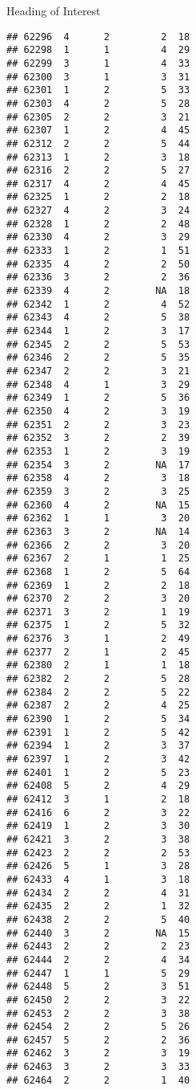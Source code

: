 \documentclass[
  ignorenonframetext,
]{beamer}
\begin{document}
\begin{frame}[fragile]{Heading of Interest}
\begin{verbatim}
## 62296  4      2         2  18
## 62298  1      1         4  29
## 62299  3      1         4  33
## 62300  3      1         3  31
## 62301  1      2         5  33
## 62303  4      2         5  28
## 62305  2      2         3  21
## 62307  1      2         4  45
## 62312  2      2         5  44
## 62313  1      2         3  18
## 62316  2      2         5  27
## 62317  4      2         4  45
## 62325  1      2         2  18
## 62327  4      2         3  24
## 62328  1      2         2  48
## 62330  4      2         3  29
## 62333  1      2         1  51
## 62335  4      2         2  50
## 62336  3      2         2  36
## 62339  4      2        NA  18
## 62342  1      2         4  52
## 62343  4      2         5  38
## 62344  1      2         3  17
## 62345  2      2         5  53
## 62346  2      2         5  35
## 62347  2      2         3  21
## 62348  4      1         3  29
## 62349  1      2         5  36
## 62350  4      2         3  19
## 62351  2      2         3  23
## 62352  3      2         2  39
## 62353  1      2         3  19
## 62354  3      2        NA  17
## 62358  4      2         3  18
## 62359  3      2         3  25
## 62360  4      2        NA  15
## 62362  1      1         3  20
## 62363  3      2        NA  14
## 62366  2      2         3  20
## 62367  2      1         1  25
## 62368  1      2         5  64
## 62369  1      2         2  18
## 62370  2      2         3  20
## 62371  3      2         1  19
## 62375  1      2         5  32
## 62376  3      1         2  49
## 62377  2      1         2  45
## 62380  2      1         1  18
## 62382  2      2         5  28
## 62384  2      2         5  22
## 62387  2      2         4  25
## 62390  1      2         5  34
## 62391  1      2         5  42
## 62394  1      2         3  37
## 62397  1      2         3  42
## 62401  1      2         5  23
## 62408  5      2         4  29
## 62412  3      1         2  18
## 62416  6      2         3  22
## 62419  1      2         3  30
## 62421  3      2         3  38
## 62423  2      2         2  53
## 62426  5      1         3  28
## 62433  4      1         3  18
## 62434  2      2         4  31
## 62435  2      2         1  32
## 62438  2      2         5  40
## 62440  3      2        NA  15
## 62443  2      2         2  23
## 62444  2      2         4  34
## 62447  1      1         5  29
## 62448  5      2         3  51
## 62450  2      2         3  22
## 62453  2      2         3  38
## 62454  2      2         5  26
## 62457  5      2         2  36
## 62462  3      2         3  19
## 62463  3      2         3  33
## 62464  2      2         1  40

\end{verbatim}
\end{frame}
\end{document}
